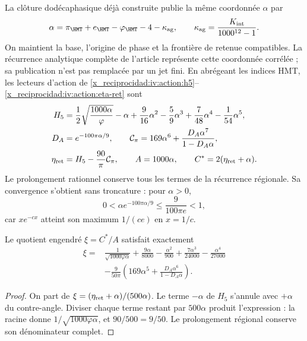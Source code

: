 La clôture dodécaphasique déjà construite publie la même coordonnée \(\alpha\) par
\[
 \alpha=\pi_{\HMT}+e_{\HMT}-\varphi_{\HMT}-4-\kappa_{\rm ag},
 \qquad \kappa_{\rm ag}=\frac{K_{\rm int}}{1000^{12}-1}.
\]
On maintient la base, l’origine de phase et la frontière de retenue compatibles. La récurrence analytique complète de l’article représente cette coordonnée corrélée ; sa publication n’est pas remplacée par un jet fini. En abrégeant les indices HMT, les lecteurs d’action de \eqref{x_reciprocidad:iv:action:h5}--\eqref{x_reciprocidad:iv:action:eta-ret} sont
\begin{align}
 H_5&=\frac12\sqrt{\frac{1000\alpha}{\varphi}}-\alpha
       +\frac9{16}\alpha^2-\frac59\alpha^3
       +\frac7{48}\alpha^4-\frac1{54}\alpha^5,\nonumber\\
 D_A&=e^{-100\pi\alpha/9},\qquad
 \mathcal C_\pi=169\alpha^6+\frac{D_A\alpha^7}{1-D_A\alpha},\nonumber\\
 \eta_{\rm ret}&=H_5-\frac{90}{\pi}\mathcal C_\pi,
 \qquad A=1000\alpha,\qquad C^*=2(\eta_{\rm ret}+\alpha).
 \label{x_reciprocidad:rec:eq:lectores-completos}
\end{align}
Le prolongement rationnel conserve tous les termes de la récurrence régionale. Sa convergence s'obtient sans troncature : pour \(\alpha>0\),
\[
 0<\alpha e^{-100\pi\alpha/9}\le\frac9{100\pi e}<1,
\]
car \(xe^{-cx}\) atteint son maximum \(1/(ce)\) en \(x=1/c\).

\begin{proposition}
\label{x_reciprocidad:rec:prop:sustitucion}
Le quotient engendré \(\xi=C^*/A\) satisfait exactement
\begin{align}
 \xi={}&\frac1{\sqrt{1000\varphi\alpha}}
 +\frac{9\alpha}{8000}-\frac{\alpha^2}{900}
 +\frac{7\alpha^3}{24000}-\frac{\alpha^4}{27000}\nonumber\\
 &-\frac9{50\pi}
 \left(169\alpha^5+\frac{D_A\alpha^6}{1-D_A\alpha}\right).
 \label{x_reciprocidad:rec:eq:xi-completa}
\end{align}
\end{proposition}
\begin{proof}
On part de \(\xi=(\eta_{\rm ret}+\alpha)/(500\alpha)\). Le terme \(-\alpha\) de \(H_5\) s’annule avec \(+\alpha\) du contre-angle. Diviser chaque terme restant par \(500\alpha\) produit l’expression : la racine donne \(1/\sqrt{1000\varphi\alpha}\), et \(90/500=9/50\). Le prolongement régional conserve son dénominateur complet.
\end{proof}

